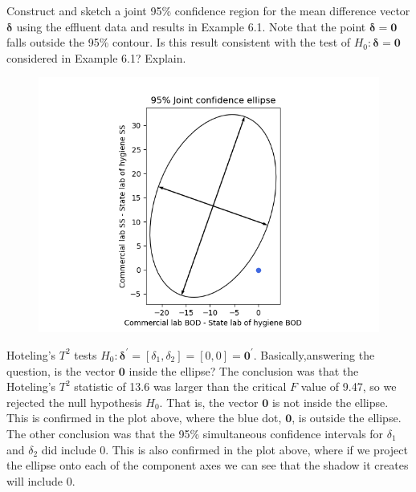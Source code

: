 Construct and sketch a joint 95\% confidence region for the mean difference vector $\bm{\delta}$
using the effluent data and results in Example 6.1. Note that the point $\bm{\delta} = \textbf{0}$ falls
outside the 95\% contour. Is this result consistent with the test of $H_{0}: \bm{\delta} = \textbf{0}$ considered
in Example 6.1? Explain.

\begin{figure}[H]
    \centering
    \includegraphics[scale=0.70]{./python/chapter-6/Question-6-1.png}
\end{figure}

Hoteling's $T^{2}$ tests $H_{0}: \bm{\delta}^{\prime} = [\delta_{1}, \delta_{2}] = [0, 0] = \textbf{0}^{\prime}$.
Basically,answering the question, is the vector $\textbf{0}$ inside the ellipse?
The conclusion was that the Hoteling's $T^{2}$ statistic of 13.6 was larger than the critical $F$ value of 9.47, so we rejected the null hypothesis $H_{0}$.
That is, the vector $\textbf{0}$ is not inside the ellipse. This is confirmed in the plot above, where the blue dot, $\textbf{0}$, is outside the ellipse.
The other conclusion was that the 95\% simultaneous confidence intervals for $\delta_{1}$ and $\delta_{2}$ did include 0.
This is also confirmed in the plot above, where if we project the ellipse onto each of the component axes we can see that the shadow it creates will include 0.